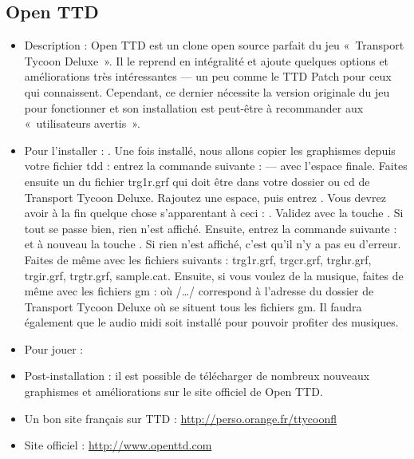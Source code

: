 \subsection{Open TTD}
\begin{itemize}
\begingroup
{}
\item Description : Open TTD est un clone open source parfait du jeu «~Transport Tycoon Deluxe~». Il le reprend en intégralité et ajoute quelques options et améliorations très intéressantes --- un peu comme le TTD Patch pour ceux qui connaissent. Cependant, ce dernier nécessite la version originale du jeu pour fonctionner et son installation est peut-être à recommander aux «~utilisateurs avertis~».{\par}
\endgroup
\item Pour l'installer : . Une fois installé, nous allons copier les graphismes depuis votre fichier tdd : entrez la commande suivante :  --- avec l'espace finale. Faites ensuite un  du fichier trg1r.grf qui doit être dans votre dossier ou cd de Transport Tycoon Deluxe. Rajoutez une espace, puis entrez  . Vous devrez avoir à la fin quelque chose s'apparentant à ceci : . Validez avec la touche . Si tout se passe bien, rien n'est affiché. Ensuite, entrez la commande suivante :  et à nouveau la touche . Si rien n'est affiché, c'est qu'il n'y a pas eu d'erreur. Faites de même avec les fichiers suivants : trg1r.grf, trgcr.grf, trghr.grf, trgir.grf, trgtr.grf, sample.cat. Ensuite, si vous voulez de la musique, faites de même avec les fichiers gm :
 où /\ldots{}/ correspond à l'adresse du dossier de Transport Tycoon Deluxe où se situent tous les fichiers gm. Il faudra également que le  audio midi soit installé  pour pouvoir profiter des musiques.{\par}
\item Pour jouer : 
\item Post-installation : il est possible de télécharger de nombreux nouveaux graphismes et améliorations sur le site officiel de Open TTD.{\par}
\item Un bon site français sur TTD : \url{http://perso.orange.fr/ttycoonfl}{\par}
\item Site officiel : \url{http://www.openttd.com}{\par}
\end{itemize}
\newpage%
